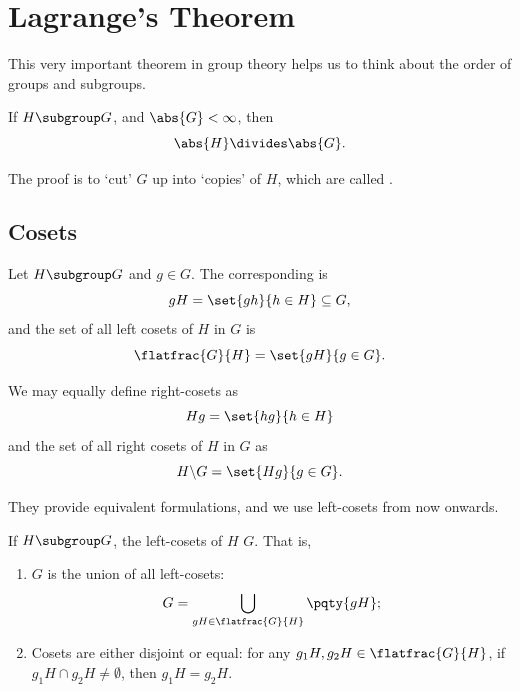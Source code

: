 \section{Lagrange's Theorem}
\label{sec:lagranges-theorem}

This very important theorem in group theory helps us to think about the order of groups and subgroups.

\begin{theorem}
    \label{thm:lagrange-weak}%
    If \(H \subgroup G\), and \(\abs{G} < \infty\), then
    \[
        \abs{H} \divides \abs{G}.
    \]
\end{theorem}

The proof is to `cut' \(G\) up into `copies' of \(H\), which are called .

\subsection{Cosets}
\label{sec:cosets}

\begin{definition}
    \label{def:left-coset}%
    Let \(H \subgroup G\) and \(g \in G\). The corresponding  is
    \[
        gH = \set{gh}{h \in H} \subseteq G,
    \]
    and the set of all left cosets of \(H\) in \(G\) is
    \[
        \flatfrac{G}{H} = \set{gH}{g \in G}.
    \]
\end{definition}

\begin{remark}
    We may equally define right-cosets as
    \[
        Hg = \set{hg}{h \in H}
    \]
    and the set of all right cosets of \(H\) in \(G\) as
    \[
        H \backslash G = \set{Hg}{g \in G}.
    \]

    They provide equivalent formulations, and we use left-cosets from now onwards.
\end{remark}

\begin{lemma}
    \label{lem:cosets-partition}%
    If \(H \subgroup G\), the left-cosets of \(H\)  \(G\). That is,
    \begin{enumerate}
        \item \(G\) is the union of all left-cosets:
        \[
            G = \bigcup_{gH \in \flatfrac{G}{H}} \pqty{gH};
        \]
        \item Cosets are either disjoint or equal: for any \(g_1 H, g_2 H \in \flatfrac{G}{H}\), if \(g_1 H \cap g_2 H \neq \emptyset\), then \(g_1 H = g_2 H\).
    \end{enumerate}
\end{lemma}

